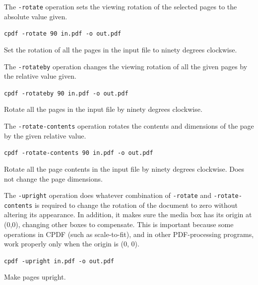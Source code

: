 \documentclass{book}
\begin{document}
The \texttt{-rotate} operation sets the viewing rotation of the selected pages to
the absolute value given.
  \begin{framed}
  \noindent\small\verb!cpdf -rotate 90 in.pdf -o out.pdf!

  \vspace{2.5mm}
  \noindent Set the rotation of all the pages in the input file to ninety degrees clockwise.
  \end{framed}
  \noindent The \texttt{-rotateby} operation changes the viewing rotation of all the
given pages by the relative value given.
  \begin{framed}
  \noindent\small\verb!cpdf -rotateby 90 in.pdf -o out.pdf!

  \vspace{2.5mm}
  \noindent Rotate all the pages in the input file by ninety degrees clockwise.
  \end{framed}
  \noindent The \texttt{-rotate-contents} operation rotates the contents and dimensions
of the page by the given relative value.
  \begin{framed}
  \noindent\small\verb!cpdf -rotate-contents 90 in.pdf -o out.pdf!

  \vspace{2.5mm}

  \noindent Rotate all the page contents in the input file by
ninety degrees clockwise. Does not change the page dimensions.
  \end{framed}

  \label{upright}
   \noindent The \texttt{-upright} operation does whatever combination of
\texttt{-rotate} and \texttt{-rotate-contents} is required to change the
rotation of the document to zero without altering its appearance. In addition, it makes sure the media box has its origin at (0,0), changing other boxes to compensate. This is important because some operations in CPDF (such as scale-to-fit), and in other PDF-processing programs, work properly only when the origin is (0, 0).

  \begin{framed}
  \noindent\small\verb!cpdf -upright in.pdf -o out.pdf!

  \vspace{2.5mm}

  \noindent Make pages upright.
  \end{framed}
\end{document}
